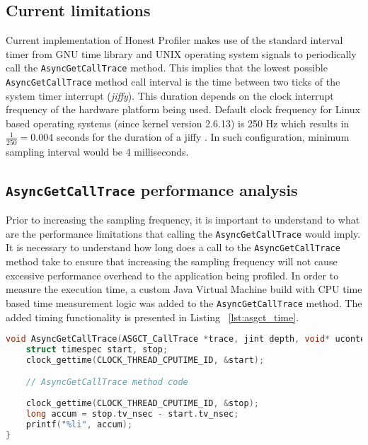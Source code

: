 \documentclass[..thesis.tex]{subfiles}
\begin{document}

\subsection{Current limitations}
Current implementation of Honest Profiler makes use of the standard interval timer from GNU time library and UNIX operating system signals to periodically call the \texttt{AsyncGetCallTrace} method. This implies that the lowest possible \texttt{Async\-Get\-Call\-Trace} method call interval is the time between two ticks of the system timer interrupt (\textit{jiffy}). This duration depends on the clock interrupt frequency of the hardware platform being used. Default clock frequency for Linux based operating systems (since kernel version 2.6.13) is 250 Hz which results in $\frac{1}{250} = 0.004$ seconds for the duration of a jiffy \cite{linux_time}. In such configuration, minimum sampling interval would be 4 milliseconds.


\subsection{\texttt{AsyncGetCallTrace} performance analysis}
Prior to increasing the sampling frequency, it is important to understand to what are the performance limitations that calling the \texttt{Async\-Get\-Call\-Trace} would imply. It is necessary to understand how long does a call to the \texttt{Async\-Get\-Call\-Trace} method take  to ensure that increasing the sampling frequency will not cause excessive performance overhead to the application being profiled. In order to measure the execution time, a custom Java Virtual Machine build with CPU time based time measurement logic was added to the \texttt{Async\-Get\-Call\-Trace} method. The added timing functionality is presented in Listing ~\ref{lst:asgct_time}.

\begin{lstlisting}[language=C++,style=def,label={lst:asgct_time}, caption={CPU time based measurement in \texttt{AsyncGetCallTrace} method}]
void AsyncGetCallTrace(ASGCT_CallTrace *trace, jint depth, void* ucontext) {
    struct timespec start, stop;
    clock_gettime(CLOCK_THREAD_CPUTIME_ID, &start);

    // AsyncGetCallTrace method code
    
    clock_gettime(CLOCK_THREAD_CPUTIME_ID, &stop);
    long accum = stop.tv_nsec - start.tv_nsec;
    printf("%li", accum);
}
\end{lstlisting}
\end{document}
